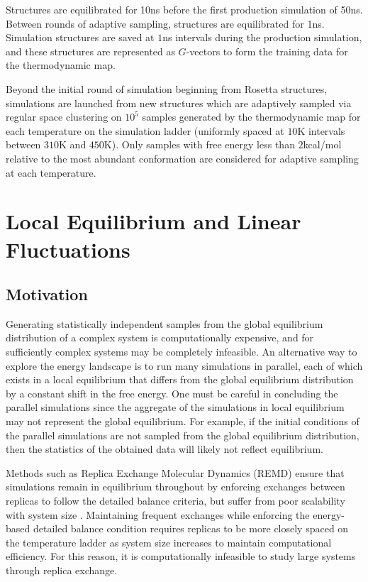 Structures are equilibrated for 10ns before the first production simulation of 50ns. Between rounds of adaptive sampling, structures are equilibrated for 1ns. Simulation structures are saved at $1$ns intervals during the production simulation, and these structures are represented as $G$-vectors to form the training data for the thermodynamic map.

Beyond the initial round of simulation beginning from Rosetta structures, simulations are launched from new structures which are adaptively sampled via regular space clustering on $10^5$ samples generated by the thermodynamic map for each temperature on the simulation ladder (uniformly spaced at $10$K intervals between $310$K and $450$K). Only samples with free energy less than $2$kcal/mol relative to the most abundant conformation are considered for adaptive sampling at each temperature.

\section{Local Equilibrium and Linear Fluctuations}
\label{ch4:app:fluctuations}

\subsection{Motivation}

Generating statistically independent samples from the global equilibrium distribution of a complex system is computationally expensive, and for sufficiently complex systems may be completely infeasible. An alternative way to explore the energy landscape is to run many simulations in parallel, each of which exists in a local equilibrium that differs from the global equilibrium distribution by a constant shift in the free energy. One must be careful in concluding the parallel simulations since the aggregate of the simulations in local equilibrium may not represent the global equilibrium. For example, if the initial conditions of the parallel simulations are not sampled from the global equilibrium distribution, then the statistics of the obtained data will likely not reflect equilibrium.

Methods such as Replica Exchange Molecular Dynamics (REMD) ensure that simulations remain in equilibrium throughout by enforcing exchanges between replicas to follow the detailed balance criteria, but suffer from poor scalability with system size \cite{ddpm-remd}. Maintaining frequent exchanges while enforcing the energy-based detailed balance condition requires replicas to be more closely spaced on the temperature ladder as system size increases to maintain computational efficiency. For this reason, it is computationally infeasible to study large systems through replica exchange.

